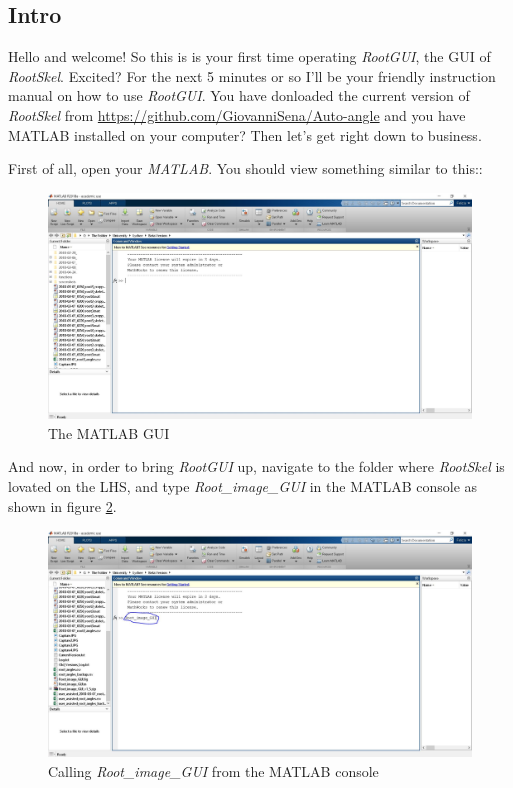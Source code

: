 \subsection{Intro}

Hello and welcome! 
So this is is your first time operating \textit{RootGUI}, the GUI of \textit{RootSkel}. Excited?
For the next 5 minutes or so I'll be your friendly instruction manual on how to use \textit{RootGUI}. 
You have donloaded the current version of \textit{RootSkel} from \url{https://github.com/GiovanniSena/Auto-angle} and you have MATLAB installed on your computer? Then let's get right down to business.

First of all, open your \textit{MATLAB}. You should view something similar to this::
\begin{figure}[H]
	\centering
	\includegraphics[width=\textwidth]{../Figures/manual/intro1.jpg}
	\caption{The MATLAB GUI}
	\label{fig:img1}
\end{figure}

And now, in order to bring \textit{RootGUI} up, navigate to the folder where \textit{RootSkel} is lovated on the LHS, and type \textit{Root\_image\_GUI} in the MATLAB console as shown in figure \ref{fig:img2}.
\begin{figure}[H]
	\centering
	\includegraphics[width=\textwidth]{../Figures/manual/intro2.jpg}
	\caption{Calling \textit{Root\_image\_GUI} from the MATLAB console}
	\label{fig:img2}
\end{figure}

